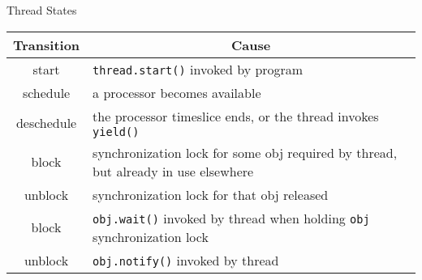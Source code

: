 \documentclass{concdistfoils}
\def\heading#1{\begin{cframed}[8.8in]{#1}\end{cframed}}
\begin{document}
\begin{slide}
\heading{Thread States}

\begin{center}
\vfill
\begin{smaller}
\begin{tabular}{|c|l|}\hline
Transition&\multicolumn{1}{c|}{Cause}\\
\hline
start     &\texttt{thread.start()} invoked by program\\
schedule  &a processor becomes available\\
deschedule&the processor timeslice ends, or the thread invokes \texttt{yield()}\\
block     &synchronization lock for some obj required by thread, but already in use elsewhere\\
unblock   &synchronization lock for that obj released\\
block     &\texttt{obj.wait()} invoked by thread when holding \texttt{obj} synchronization lock\\
unblock   &\texttt{obj.notify()} invoked by thread\\
\hline
\end{tabular}
\end{smaller}
\end{center}
\end{slide}
\end{document}
